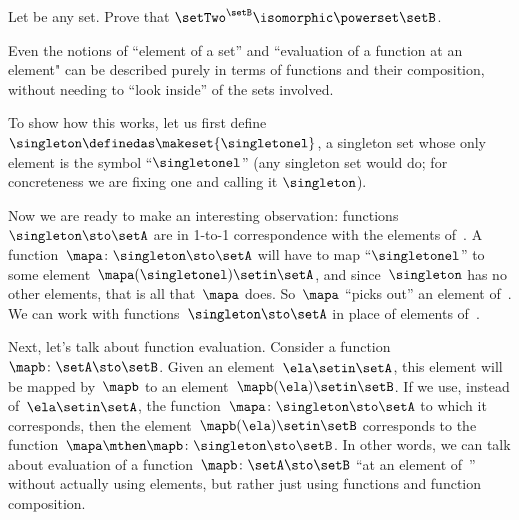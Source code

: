 \begin{gradedexercise}
    \label{ex:SubsetsAsFunctions}

    Let \setB be any set.
    Prove that $\setTwo^\setB \isomorphic \powerset \setB$.
\end{gradedexercise}


\begin{example}
    Even the notions of ``element of a set'' and ``evaluation of a function at an element" can be described purely in terms of functions and their composition, without needing to ``look inside'' of the sets involved.

    To show how this works, let us first define $\singleton \definedas \makeset{\singletonel}$, a singleton set whose only element is the symbol ``$\singletonel$'' (any singleton set would do; for concreteness we are fixing one and calling it $\singleton$).

    Now we are ready to make an interesting observation: functions~$\singleton \sto \setA$ are in 1-to-1 correspondence with the elements of~\setA.
    A function~$\mapa\colon \singleton \sto \setA$ will have to map ``$\singletonel$'' to some element~$\mapa(\singletonel) \setin\setA$, and since~$\singleton$ has no other elements, that is all that~$\mapa$ does.
    So~$\mapa$ ``picks out'' an element of~\setA.
    We can work with functions~$\singleton \sto \setA$ in place of elements of~\setA.

    Next, let's talk about function evaluation.
    Consider a function~$\mapb \colon \setA \sto \setB$.
    Given an element~$\ela \setin\setA$, this element will be mapped by~$\mapb$ to an element~$\mapb(\ela) \setin\setB$.
    If we use, instead of~$\ela \setin\setA$, the function~$\mapa \colon \singleton \sto \setA$ to which it corresponds, then the element~$\mapb(\ela) \setin\setB$ corresponds to the function~$\mapa \mthen \mapb\colon \singleton \sto \setB$.
    In other words, we can talk about evaluation of a function~$\mapb \colon \setA \sto \setB$ ``at an element of~\setA'' without actually using elements, but rather just using functions and function composition.
\end{example}
